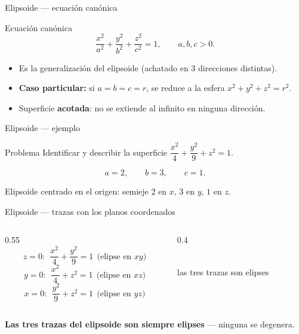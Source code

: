 \documentclass[11pt,aspectratio=169]{beamer}
\begin{document}
\begin{frame}{Elipsoide --- ecuación canónica}
  \begin{block}{Ecuación canónica}
    \[
      \frac{x^2}{a^2}+\frac{y^2}{b^2}+\frac{z^2}{c^2}=1, \qquad a,b,c>0.
    \]
  \end{block}
  \pause
  \begin{itemize}
    \item Es la generalización del elipsoide (achatado en 3 direcciones distintas).
    \pause
    \item \textbf{Caso particular:} si $a=b=c=r$, se reduce a la esfera $x^2+y^2+z^2=r^2$.
    \pause
    \item Superficie \textbf{acotada}: no se extiende al infinito en ninguna dirección.
  \end{itemize}
\end{frame}

\begin{frame}{Elipsoide --- ejemplo}
  \begin{block}{Problema}
    Identificar y describir la superficie $\dfrac{x^2}{4}+\dfrac{y^2}{9}+z^2=1$.
  \end{block}
  \pause
  \[
    a=2,\qquad b=3,\qquad c=1.
  \]
  \pause
  \begin{center}\normalsize\color{tealx}
  Elipsoide centrado en el origen: semieje $2$ en $x$, $3$ en $y$, $1$ en $z$.
  \end{center}
\end{frame}

\begin{frame}{Elipsoide --- trazas con los planos coordenados}
  \begin{columns}
    \begin{column}{0.55\textwidth}
      \[
        z=0:\ \ \frac{x^2}{4}+\frac{y^2}{9}=1 \ \ \text{(elipse en } xy\text{)}
      \]
      \pause
      \[
        y=0:\ \ \frac{x^2}{4}+z^2=1 \ \ \text{(elipse en } xz\text{)}
      \]
      \pause
      \[
        x=0:\ \ \frac{y^2}{9}+z^2=1 \ \ \text{(elipse en } yz\text{)}
      \]
    \end{column}
    \begin{column}{0.4\textwidth}
      \centering
      \\
      \small\color{gray60} las tres trazas son elipses
    \end{column}
  \end{columns}
  \pause
  \vspace{4pt}
  \begin{center}\normalsize\color{tealx}\textbf{Las tres trazas del elipsoide son siempre elipses} --- ninguna se degenera.\end{center}
\end{frame}
\end{document}
